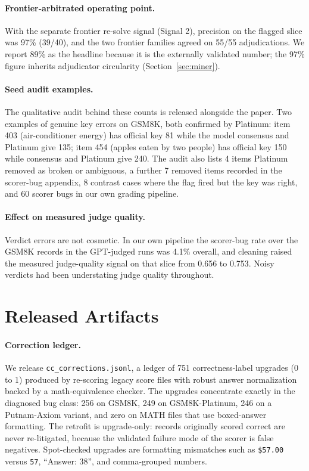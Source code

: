 \documentclass[11pt]{article}
\begin{document}
\paragraph{Frontier-arbitrated operating point.}
With the separate frontier re-solve signal (Signal 2), precision on the flagged slice was 97\% (39/40), and the two frontier families agreed on 55/55 adjudications.
We report 89\% as the headline because it is the externally validated number; the 97\% figure inherits adjudicator circularity (Section~\ref{sec:miner}).

\paragraph{Seed audit examples.}
The qualitative audit behind these counts is released alongside the paper.
Two examples of genuine key errors on GSM8K, both confirmed by Platinum:
item 403 (air-conditioner energy) has official key 81 while the model consensus and Platinum give 135;
item 454 (apples eaten by two people) has official key 150 while consensus and Platinum give 240.
The audit also lists 4 items Platinum removed as broken or ambiguous, a further 7 removed items recorded in the scorer-bug appendix, 8 contrast cases where the flag fired but the key was right, and 60 scorer bugs in our own grading pipeline.

\paragraph{Effect on measured judge quality.}
Verdict errors are not cosmetic.
In our own pipeline the scorer-bug rate over the GSM8K records in the GPT-judged runs was 4.1\% overall, and cleaning raised the measured judge-quality signal on that slice from 0.656 to 0.753.
Noisy verdicts had been understating judge quality throughout.

\section{Released Artifacts}

\paragraph{Correction ledger.}
We release \texttt{cc\_corrections.jsonl}, a ledger of 751 correctness-label upgrades (0 to 1) produced by re-scoring legacy score files with robust answer normalization backed by a math-equivalence checker.
The upgrades concentrate exactly in the diagnosed bug class: 256 on GSM8K, 249 on GSM8K-Platinum, 246 on a Putnam-Axiom variant, and zero on MATH files that use boxed-answer formatting.
The retrofit is upgrade-only: records originally scored correct are never re-litigated, because the validated failure mode of the scorer is false negatives.
Spot-checked upgrades are formatting mismatches such as \texttt{\$57.00} versus \texttt{57}, ``Answer: 38'', and comma-grouped numbers.
\end{document}
